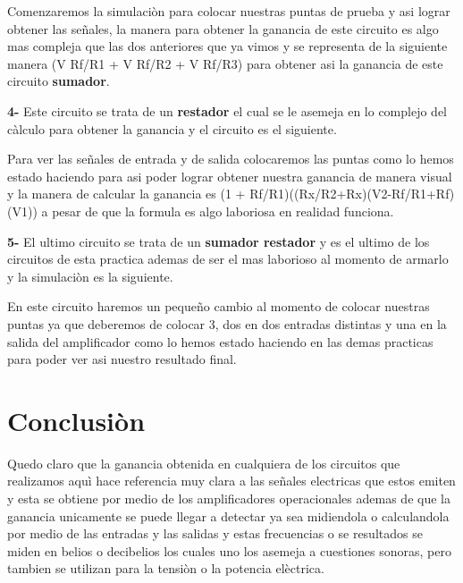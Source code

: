 \documentclass[12pt,a4paper]{article}
\begin{document}
Comenzaremos la simulaciòn para colocar nuestras puntas de prueba y asi lograr obtener las señales, la manera para obtener la ganancia de este circuito es algo mas compleja que las dos anteriores que ya vimos y se representa de la siguiente manera (V Rf/R1 + V Rf/R2 + V Rf/R3) para obtener asi la ganancia de este circuito \textbf{sumador}.

\begin{figure}
\centering

\end{figure}


\textbf{4-} Este circuito se trata de un \textbf{restador} el cual se le asemeja en lo complejo del càlculo para obtener la ganancia y el circuito es el siguiente.

\begin{figure}
\centering

\end{figure}

Para ver las señales de entrada y de salida colocaremos las puntas como lo hemos estado haciendo para asi poder lograr obtener nuestra ganancia de manera visual y la manera de calcular la ganancia es (1 + Rf/R1)((Rx/R2+Rx)(V2-Rf/R1+Rf) (V1)) a pesar de que la formula es algo laboriosa en realidad funciona.

\begin{figure}
\centering

\end{figure}

\textbf{5-} El ultimo circuito se trata de un \textbf{sumador restador} y es el ultimo de los circuitos de esta practica ademas de ser el mas laborioso al momento de armarlo y la simulaciòn es la siguiente.

\begin{figure}
\centering

\end{figure}

En este circuito haremos un pequeño cambio al momento de colocar nuestras puntas ya que deberemos de colocar 3, dos en dos entradas distintas y una en la salida del amplificador como lo hemos estado haciendo en las demas practicas para poder ver asi nuestro resultado final.

\begin{figure}
\centering

\end{figure}

\section{Conclusiòn}
Quedo claro que la ganancia obtenida en cualquiera de los circuitos que realizamos aquì hace referencia muy clara a las señales electricas que estos emiten y esta se obtiene por medio de los amplificadores operacionales ademas de que la ganancia unicamente se puede llegar a detectar ya sea midiendola o calculandola por medio de las entradas y las salidas y estas frecuencias o se resultados se miden en belios o decibelios los cuales uno los asemeja a cuestiones sonoras, pero tambien se utilizan para la tensiòn o la potencia elèctrica.
\end{document}
